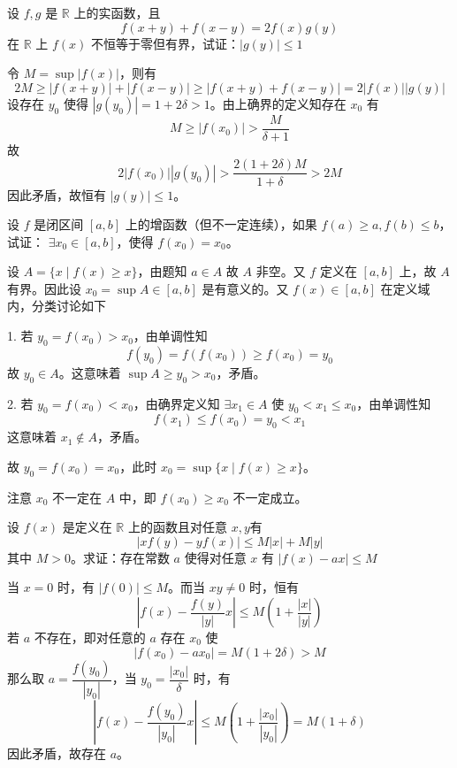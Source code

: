\begin{problem}[000004]
设 $f,g$ 是 $\mathbb{R}$ 上的实函数，且
\[ f(x+y)+f(x-y) = 2f(x)g(y)\]
在 $\mathbb{R}$ 上 $f(x)$ 不恒等于零但有界，试证：$|g(y)|\leqslant 1$
\end{problem}
\begin{solution}
	令 $M=\sup|f(x)|$，则有
	\[ 2M\geqslant |f(x+y)|+|f(x-y)| \geqslant |f(x+y)+f(x-y)| = 2|f(x)||g(y)| \]
	设存在 $y_0$ 使得 $|g(y_0)|=1+2\delta>1$。由上确界的定义知存在 $x_0$ 有
	\[ M \geqslant |f(x_0)| > \frac{M}{\delta+1}\]
	故
	\[ 2|f(x_0)||g(y_0)| > \frac{2(1+2\delta)M}{1+\delta} > 2M\]
	因此矛盾，故恒有 $|g(y)|\leqslant 1$。
\end{solution}


\begin{problem}[000005]
设 $f$ 是闭区间 $[a,b]$ 上的增函数（但不一定连续），如果 $f(a) \geqslant a,f(b) \leqslant b$，试证： $\exists x_0 \in [a,b]$，使得 $f(x_0) = x_0$。
\end{problem}
\begin{solution}
	设 $A=\{x \mid f(x) \geqslant x\}$，由题知 $a\in A$ 故 $A$ 非空。又 $f$ 定义在 $[a,b]$ 上，故 $A$ 有界。因此设 $x_0=\sup A\in [a,b]$ 是有意义的。又 $f(x)\in[a,b]$ 在定义域内，分类讨论如下

	1. 若 $y_0=f(x_0) > x_0$，由单调性知
	\[ f(y_0)=f(f(x_0)) \geqslant f(x_0) = y_0\]
	故 $y_0\in A$。这意味着 $\sup A \geqslant y_0 >x_0$，矛盾。

	2. 若 $y_0=f(x_0) < x_0$，由确界定义知 $\exists x_1\in A$ 使 $y_0<x_1\leqslant x_0$，由单调性知
	\[ f(x_1)\leqslant f(x_0)=y_0 <x_1\]
	这意味着 $x_1\notin A$，矛盾。

	故 $y_0=f(x_0)=x_0$，此时 $x_0 = \sup\{x \mid f(x) \geqslant x\}$。

	注意 $x_0$ 不一定在 $A$ 中，即 $f(x_0) \geqslant x_0$ 不一定成立。
\end{solution}


\begin{problem}[000006]
设 $f(x)$ 是定义在 $\mathbb{R}$ 上的函数且对任意 $x,y$有
\[ |xf(y)-yf(x)| \leqslant M|x|+M|y|\]
其中 $M > 0$。求证：存在常数 $a$ 使得对任意 $x$ 有 $|f(x)-ax| \leqslant M$
\end{problem}
\begin{solution}
	当 $x=0$ 时，有 $|f(0)|\leqslant M$。而当 $xy\ne 0$ 时，恒有
	\[ \left| f(x)-\frac{f(y)}{|y|}x \right| \leqslant M \left(1+\frac{|x|}{|y|}\right)\]
	若 $a$ 不存在，即对任意的 $a$ 存在 $x_0$ 使
	\[ |f(x_0)-ax_0|=M(1+2\delta)>M\]
	那么取 $a = \dfrac{f(y_0)}{|y_0|}$，当 $y_0=\dfrac{|x_0|}{\delta}$ 时，有
	\[ \left| f(x)-\frac{f(y_0)}{|y_0|}x \right| \leqslant M \left(1+ \frac{|x_0|}{|y_0|}\right)=M(1+\delta)\]
	因此矛盾，故存在 $a$。
\end{solution}

